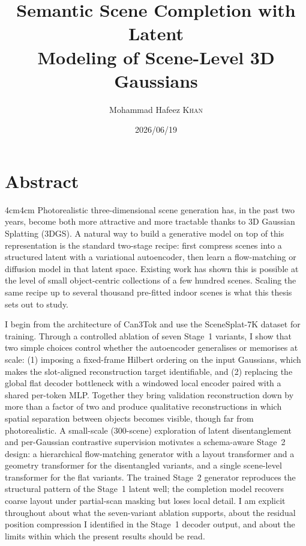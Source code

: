 \documentclass[license]{mscaithesis}
\title{Semantic Scene Completion with Latent\\
       Modeling of Scene-Level 3D Gaussians}
\date{2026/06/19}  %
\author{Mohammad Hafeez \textsc{Khan}}
\begin{document}
\maketitle

\frontmatter

    \chapter*{Abstract}
        \begin{adjustwidth}{4cm}{4cm}
            Photorealistic three-dimensional scene generation has, in the past two years, become both more attractive and more tractable thanks to 3D Gaussian Splatting (3DGS). A natural way to build a generative model on top of this representation is the standard two-stage recipe: first compress scenes into a structured latent with a variational autoencoder, then learn a flow-matching or diffusion model in that latent space. Existing work has shown this is possible at the level of small object-centric collections of a few hundred scenes. Scaling the same recipe up to several thousand pre-fitted indoor scenes is what this thesis sets out to study.

I begin from the architecture of Can3Tok \citep{gao2025can3tok} and use the SceneSplat-7K dataset \citep{li2025scenesplat} for training. Through a controlled ablation of seven Stage~1 variants, I show that two simple choices control whether the autoencoder generalises or memorises at scale: (1) imposing a fixed-frame Hilbert ordering on the input Gaussians, which makes the slot-aligned reconstruction target identifiable, and (2) replacing the global flat decoder bottleneck with a windowed local encoder paired with a shared per-token MLP. Together they bring validation reconstruction down by more than a factor of two and produce qualitative reconstructions in which spatial separation between objects becomes visible, though far from photorealistic. A small-scale (300-scene) exploration of latent disentanglement and per-Gaussian contrastive supervision motivates a schema-aware Stage~2 design: a hierarchical flow-matching generator with a layout transformer and a geometry transformer for the disentangled variants, and a single scene-level transformer for the flat variants. The trained Stage~2 generator reproduces the structural pattern of the Stage~1 latent well; the completion model recovers coarse layout under partial-scan masking but loses local detail. I am explicit throughout about what the seven-variant ablation supports, about the residual position compression I identified in the Stage~1 decoder output, and about the limits within which the present results should be read.
        \end{adjustwidth}
\end{document}
